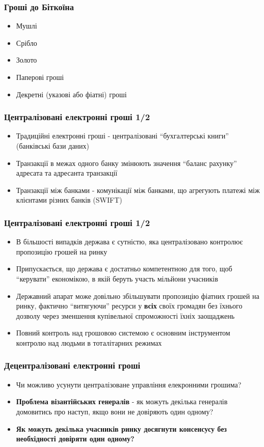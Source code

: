 \documentclass{beamer}
\begin{document}
\begin{frame}
  \frametitle{Гроші до Біткоїна}
  \begin{itemize}
  \item Мушлі
  \item Срібло
  \item Золото
  \item Паперові гроші
  \item Декретні (указові або фіатні) гроші
  \end{itemize}
\end{frame}

\begin{frame}
  \frametitle{Централізовані електронні гроші 1/2}
  \begin{itemize}
  \item Традиційні електронні гроші - централізовані ``бухгалтерські книги''
    (банківські бази даних)
  \item Транзакції в межах одного банку змінюють значення ``баланс рахунку''
    адресата та адресанта транзакції
  \item Транзакції між банками - комунікації між банками, що агрегують платежі
    між клієнтами різних банків (SWIFT)
  \end{itemize}
\end{frame}

\begin{frame}
  \frametitle{Централізовані електронні гроші 1/2}
  \begin{itemize}
  \item В більшості випадків держава є сутністю, яка централізовано контролює
    пропозицію грошей на ринку
  \item Припускається, що держава є достатньо компетентною для того, щоб
    ``керувати'' економікою, в якій беруть участь мільйони учасників
  \item Державний апарат може довільно збільшувати пропозицію фіатних грошей на
    ринку, фактично ``витягуючи'' ресурси у \textbf{всіх} своїх громадян без
    їхнього дозволу через зменшення купівельної спроможності їхніх заощаджень
  \item Повний контроль над грошовою системою є основним інструментом контролю
    над людьми в тоталітарних режимах
  \end{itemize}
\end{frame}

\begin{frame}
  \frametitle{Децентралізовані електронні гроші}
  \begin{itemize}
  \item Чи можливо усунути централізоване управління елекронними грошима?
  \item \textbf{Проблема візантійських генералів} - як можуть декілька генералів
    домовитись про наступ, якщо вони не довіряють один одному?
  \item \textbf{Як можуть декілька учасників ринку досягнути консенсусу без
      необхідності довіряти один одному?}
  \end{itemize}
\end{frame}
\end{document}
